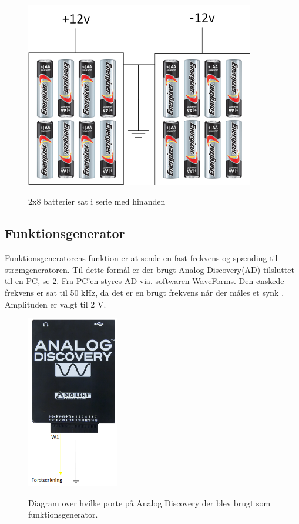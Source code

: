 \begin{figure}[H]
\centering
{\includegraphics[width=10cm]
{Figure/12vbatteri}}
\caption{2x8 batterier sat i serie med hinanden}
\label{fig:12vbatteri}
\end{figure}

\subsection{Funktionsgenerator}
Funktionsgeneratorens funktion er at sende en fast frekvens og spænding til strømgeneratoren. Til dette formål er der brugt Analog Discovery(AD) tilsluttet til en PC, se \ref{fig:analogdis}. Fra PC'en styres AD via. softwaren WaveForms. Den ønskede frekvens er sat til 50 kHz, da det er en brugt frekvens når der måles et synk   \cite{Kusuhara2004} \citep{Brantlov2017}. Amplituden er valgt til 2 V. 

\begin{figure}[H]
\centering
{\includegraphics[width=4cm]
{Figure/analogdis}}
\caption{Diagram over hvilke porte på Analog Discovery der blev brugt  som funktionsgenerator.}
\label{fig:analogdis}
\end{figure}


